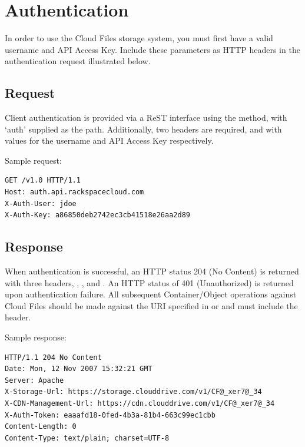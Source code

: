 \documentclass[letterpaper,10pt,english]{manual}
\begin{document}
\section{Authentication}

In order to use the Cloud Files storage system, you must first have a
valid username and API Access Key. Include these parameters as HTTP
headers in the authentication request illustrated below.


\subsection{Request}

Client authentication is provided via a ReST interface using the 
method, with `auth' supplied as the path. Additionally, two headers are
required,  and  with values for the username
and API Access Key respectively.

Sample request:

\begin{Verbatim}[commandchars=@\[\]]
GET /v1.0 HTTP/1.1
Host: auth.api.rackspacecloud.com
X-Auth-User: jdoe
X-Auth-Key: a86850deb2742ec3cb41518e26aa2d89
\end{Verbatim}


\subsection{Response}

When authentication is successful, an HTTP status 204 (No Content) is
returned with three headers, , ,
and . An HTTP status of 401 (Unauthorized) is returned
upon authentication failure. All subsequent Container/Object operations
against Cloud Files should be made against the URI specified in
 or  and must include the
 header.

Sample response:

\begin{Verbatim}[commandchars=@\[\]]
HTTP/1.1 204 No Content
Date: Mon, 12 Nov 2007 15:32:21 GMT
Server: Apache
X-Storage-Url: https://storage.clouddrive.com/v1/CF@_xer7@_34
X-CDN-Management-Url: https://cdn.clouddrive.com/v1/CF@_xer7@_34
X-Auth-Token: eaaafd18-0fed-4b3a-81b4-663c99ec1cbb
Content-Length: 0
Content-Type: text/plain; charset=UTF-8
\end{Verbatim}
\end{document}
